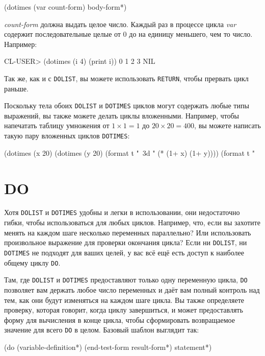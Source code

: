 \begin{myverb}
(dotimes (var count-form)
  body-form*)
\end{myverb}

\noindent{}\textit{count-form} должна выдать целое число. Каждый раз в процессе цикла \textit{var}
содержит последовательные целые от 0 до на единицу меньшего, чем то число.  Например:

\begin{myverb}
CL-USER> (dotimes (i 4) (print i))
0
1
2
3
NIL
\end{myverb}

Так же, как и с \lstinline{DOLIST}, вы можете использовать \lstinline{RETURN}, чтобы прервать цикл
раньше.

Поскольку тела обоих \lstinline{DOLIST} и \lstinline{DOTIMES} циклов могут содержать любые типы
выражений, вы также можете делать циклы вложенными. Например, чтобы напечатать таблицу
умножения от $1 \times 1 = 1$ до $20 \times 20 = 400$, вы можете написать такую пару вложенных циклов
\lstinline{DOTIMES}:

\begin{myverb}
(dotimes (x 20)
  (dotimes (y 20)
    (format t "~3d " (* (1+ x) (1+ y))))
  (format t "~%
\end{myverb}

\section{DO}

Хотя \lstinline{DOLIST} и \lstinline{DOTIMES} удобны и легки в использовании, они недостаточно
гибки, чтобы использоваться для любых циклов. Например, что, если вы захотите менять на
каждом шаге несколько переменных параллельно? Или использовать произвольное выражение для
проверки окончания цикла? Если ни \lstinline{DOLIST}, ни \lstinline{DOTIMES} не подходят для ваших
целей, у вас всё ещё есть доступ к наиболее общему циклу \lstinline{DO}.

Там, где \lstinline{DOLIST} и \lstinline{DOTIMES} предоставляют только одну переменную цикла,
\lstinline{DO} позволяет вам держать любое число переменных и даёт вам полный контроль над тем,
как они будут изменяться на каждом шаге цикла. Вы также определяете проверку, которая
говорит, когда циклу завершиться, и может предоставлять форму для вычисления в конце цикла,
чтобы сформировать возвращаемое значение для всего \lstinline{DO} в целом. Базовый шаблон
выглядит так:

\begin{myverb}
(do (variable-definition*)
    (end-test-form result-form*)
  statement*)
\end{myverb}

